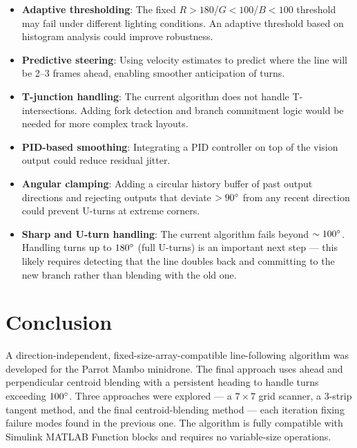 \documentclass[conference, twocolumn]{IEEEtran}
\begin{document}
\begin{itemize}
    \item \textbf{Adaptive thresholding}: The fixed $R>180$/$G<100$/$B<100$ threshold may fail under different lighting conditions. An adaptive threshold based on histogram analysis could improve robustness.
    \item \textbf{Predictive steering}: Using velocity estimates to predict where the line will be 2--3 frames ahead, enabling smoother anticipation of turns.
    \item \textbf{T-junction handling}: The current algorithm does not handle T-intersections. Adding fork detection and branch commitment logic would be needed for more complex track layouts.
    \item \textbf{PID-based smoothing}: Integrating a PID controller on top of the vision output could reduce residual jitter.
    \item \textbf{Angular clamping}: Adding a circular history buffer of past output directions and rejecting outputs that deviate $>90\degree$ from any recent direction could prevent U-turns at extreme corners.
    \item \textbf{Sharp and U-turn handling}: The current algorithm fails beyond $\sim100\degree$. Handling turns up to $180\degree$ (full U-turns) is an important next step --- this likely requires detecting that the line doubles back and committing to the new branch rather than blending with the old one.
\end{itemize}

\section*{Conclusion}

A direction-independent, fixed-size-array-compatible line-following algorithm was developed for the Parrot Mambo minidrone. The final approach uses ahead and perpendicular centroid blending with a persistent heading to handle turns exceeding $100\degree$. Three approaches were explored --- a $7\times7$ grid scanner, a 3-strip tangent method, and the final centroid-blending method --- each iteration fixing failure modes found in the previous one. The algorithm is fully compatible with Simulink MATLAB Function blocks and requires no variable-size operations.
\end{document}
